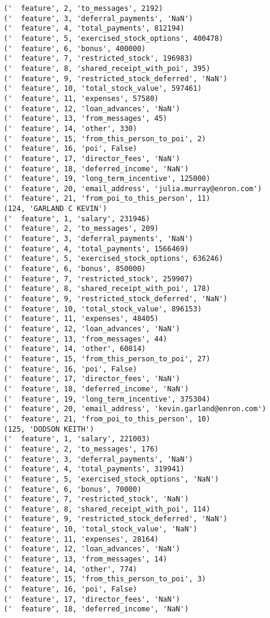 \begin{verbatim}
('  feature', 2, 'to_messages', 2192)
('  feature', 3, 'deferral_payments', 'NaN')
('  feature', 4, 'total_payments', 812194)
('  feature', 5, 'exercised_stock_options', 400478)
('  feature', 6, 'bonus', 400000)
('  feature', 7, 'restricted_stock', 196983)
('  feature', 8, 'shared_receipt_with_poi', 395)
('  feature', 9, 'restricted_stock_deferred', 'NaN')
('  feature', 10, 'total_stock_value', 597461)
('  feature', 11, 'expenses', 57580)
('  feature', 12, 'loan_advances', 'NaN')
('  feature', 13, 'from_messages', 45)
('  feature', 14, 'other', 330)
('  feature', 15, 'from_this_person_to_poi', 2)
('  feature', 16, 'poi', False)
('  feature', 17, 'director_fees', 'NaN')
('  feature', 18, 'deferred_income', 'NaN')
('  feature', 19, 'long_term_incentive', 125000)
('  feature', 20, 'email_address', 'julia.murray@enron.com')
('  feature', 21, 'from_poi_to_this_person', 11)
(124, 'GARLAND C KEVIN')
('  feature', 1, 'salary', 231946)
('  feature', 2, 'to_messages', 209)
('  feature', 3, 'deferral_payments', 'NaN')
('  feature', 4, 'total_payments', 1566469)
('  feature', 5, 'exercised_stock_options', 636246)
('  feature', 6, 'bonus', 850000)
('  feature', 7, 'restricted_stock', 259907)
('  feature', 8, 'shared_receipt_with_poi', 178)
('  feature', 9, 'restricted_stock_deferred', 'NaN')
('  feature', 10, 'total_stock_value', 896153)
('  feature', 11, 'expenses', 48405)
('  feature', 12, 'loan_advances', 'NaN')
('  feature', 13, 'from_messages', 44)
('  feature', 14, 'other', 60814)
('  feature', 15, 'from_this_person_to_poi', 27)
('  feature', 16, 'poi', False)
('  feature', 17, 'director_fees', 'NaN')
('  feature', 18, 'deferred_income', 'NaN')
('  feature', 19, 'long_term_incentive', 375304)
('  feature', 20, 'email_address', 'kevin.garland@enron.com')
('  feature', 21, 'from_poi_to_this_person', 10)
(125, 'DODSON KEITH')
('  feature', 1, 'salary', 221003)
('  feature', 2, 'to_messages', 176)
('  feature', 3, 'deferral_payments', 'NaN')
('  feature', 4, 'total_payments', 319941)
('  feature', 5, 'exercised_stock_options', 'NaN')
('  feature', 6, 'bonus', 70000)
('  feature', 7, 'restricted_stock', 'NaN')
('  feature', 8, 'shared_receipt_with_poi', 114)
('  feature', 9, 'restricted_stock_deferred', 'NaN')
('  feature', 10, 'total_stock_value', 'NaN')
('  feature', 11, 'expenses', 28164)
('  feature', 12, 'loan_advances', 'NaN')
('  feature', 13, 'from_messages', 14)
('  feature', 14, 'other', 774)
('  feature', 15, 'from_this_person_to_poi', 3)
('  feature', 16, 'poi', False)
('  feature', 17, 'director_fees', 'NaN')
('  feature', 18, 'deferred_income', 'NaN')

\end{verbatim}
